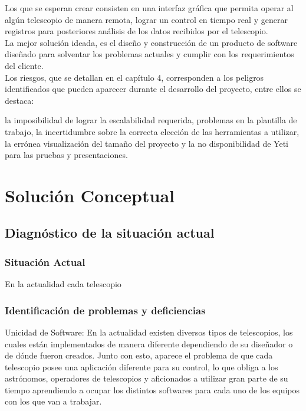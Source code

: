 \documentclass[letterpaper,spanish,10pt]{article}
\begin{document}
Los que se esperan crear consisten en una interfaz gr\'afica que permita operar al 
alg\'un telescopio de manera remota, lograr un control en tiempo real y generar 
registros para posteriores an\'alisis de los datos recibidos por el telescopio.\\

La mejor soluci\'on ideada, es el dise\~no y construcci\'on de un producto de software dise\~nado 
para solventar los problemas actuales y cumplir con los requerimientos del cliente.\\

Los riesgos, que se detallan en el cap\'itulo 4, corresponden a los peligros identificados 
que pueden aparecer durante el desarrollo del proyecto, entre ellos se destaca: 

la 
imposibilidad de lograr la escalabilidad requerida, problemas en la plantilla de trabajo, 
la incertidumbre sobre la correcta elecci\'on de las herramientas a utilizar, la err\'onea 
visualizaci\'on del tama\~no del proyecto y la no disponibilidad de Yeti para las pruebas y 
presentaciones.\\





\newpage
\section{Soluci\'on Conceptual} %
\subsection{Diagn\'ostico de la situaci\'on actual}
\subsubsection{Situaci\'on Actual}
En la actualidad cada telescopio 



\subsubsection{Identificaci\'on de problemas y deficiencias}

Unicidad de Software: En la actualidad existen diversos tipos de telescopios, los cuales est\'an implementados de manera diferente dependiendo de su dise\~nador o de d\'onde fueron creados. Junto con esto, aparece el problema de que cada telescopio posee una aplicaci\'on diferente para su control, lo que obliga a los astr\'onomos, operadores de telescopios y aficionados a utilizar gran parte de su tiempo aprendiendo a ocupar los distintos softwares para cada uno de los equipos con los que van a trabajar.
\end{document}
